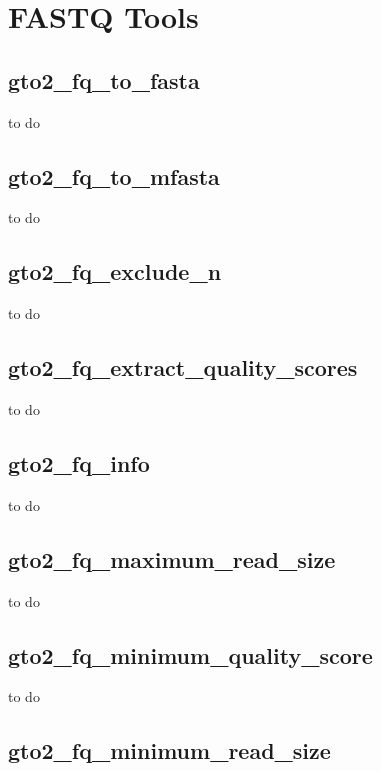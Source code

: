 \documentclass[11pt,]{krantz}
\begin{document}
\chapter{FASTQ Tools}\label{fastq-tools}

\section{gto2\_fq\_to\_fasta}\label{gto2_fq_to_fasta}

to do

\section{gto2\_fq\_to\_mfasta}\label{gto2_fq_to_mfasta}

to do

\section{gto2\_fq\_exclude\_n}\label{gto2_fq_exclude_n}

to do

\section{gto2\_fq\_extract\_quality\_scores}\label{gto2_fq_extract_quality_scores}

to do

\section{gto2\_fq\_info}\label{gto2_fq_info}

to do

\section{gto2\_fq\_maximum\_read\_size}\label{gto2_fq_maximum_read_size}

to do

\section{gto2\_fq\_minimum\_quality\_score}\label{gto2_fq_minimum_quality_score}

to do

\section{gto2\_fq\_minimum\_read\_size}\label{gto2_fq_minimum_read_size}
\end{document}
